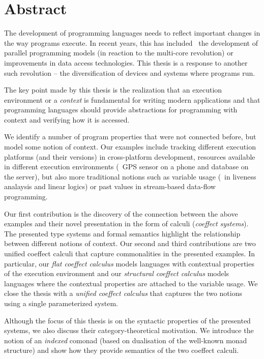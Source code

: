 
\begingroup
\let\clearpage\relax
\let\cleardoublepage\relax
\let\cleardoublepage\relax

\chapter*{Abstract} %
The development of programming languages needs to reflect important changes in the way
programs execute. In recent years, this has included \eg~the development of parallel programming 
models (in reaction to the multi-core revolution) or improvements in data access technologies. 
This thesis is a response to another such revolution -- the diversification of devices and 
systems where programs run. 

The key point made by this thesis is the realization that an execution environment or
a \emph{context} is fundamental for writing modern applications and that programming 
languages should provide abstractions for programming with context and verifying how 
it is accessed. 

We identify a number of program properties that were not connected before, but model some notion 
of context. Our examples include tracking different execution platforms (and their versions) 
in cross-platform development, resources available in different execution environments (\eg~GPS
sensor on a phone and database on the server), but also more traditional notions such as 
variable usage (\eg~in liveness analaysis and linear logics) or past values in 
stream-based data-flow programming.

Our first contribution is the discovery of the connection between the above examples and
their novel presentation in the form of calculi (\emph{coeffect systems}). The presented type 
systems and formal semantics highlight the relationship between different notions of context. 
Our second and third contributions are two unified coeffect calculi that capture commonalities 
in the presented examples. In particular, our \emph{flat coeffect calculus} models languages 
with contextual properties of the execution environment and our \emph{structural coeffect 
calculus} models languages where the contextual properties are attached to the variable usage.
We close the thesis with a \emph{unified coeffect calculus} that captures the two notions
using a single parameterized system.

Although the focus of this thesis is on the syntactic properties of the presented 
systems, we also discuss their category-theoretical motivation. We introduce the notion of
an \emph{indexed} comonad (based on dualisation of the well-known monad structure) and show 
how they provide semantics of the two coeffect calculi. 

\endgroup			

\vfill